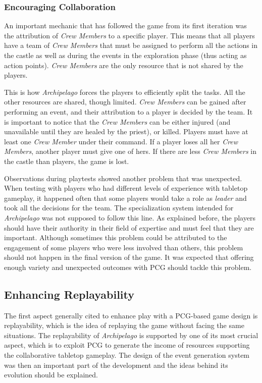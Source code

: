\subsubsection{Encouraging Collaboration} 
An important mechanic that has followed the game from its first iteration was the attribution of \textit{Crew Members} to a specific player. This means that all players have a team of \textit{Crew Members} that must be assigned to perform all the actions in the castle as well as during the events in the exploration phase (thus acting as action points). \textit{Crew Members} are the only resource that is not shared by the players.

This is how \textit{Archipelago} forces the players to efficiently split the tasks. All the other resources are shared, though limited. \textit{Crew Members} can be gained after performing an event, and their attribution to a player is decided by the team. It is important to notice that the \textit{Crew Members} can be either injured (and unavailable until they are healed by the priest), or killed. Players must have at least one \textit{Crew Member} under their command. If a player loses all her \textit{Crew Members}, another player must give one of hers. If there are less \textit{Crew Members} in the castle than players, the game is lost.

Observations during playtests showed another problem that was unexpected. When testing with players who had different levels of experience with tabletop gameplay, it happened often that some players would take a role as \textit{leader} and took all the decisions for the team. The specialization system intended for \textit{Archipelago} was not supposed to follow this line. As explained before, the players should have their authority in their field of expertise and must feel that they are important. Although sometimes this problem could be attributed to the engagement of some players who were less involved than others, this problem should not happen in the final version of the game. It was expected that offering enough variety and unexpected outcomes with PCG should tackle this problem.
\subsection{Enhancing Replayability} 
The first aspect generally cited to enhance play with a PCG-based game design is replayability, which is the idea of replaying the game without facing the same situations. The replayability of \textit{Archipelago} is supported by one of its most crucial aspect, which is to exploit PCG to generate the income of resources supporting the collaborative tabletop gameplay. The design of the event generation system was then an important part of the development and the ideas behind its evolution should be explained.
